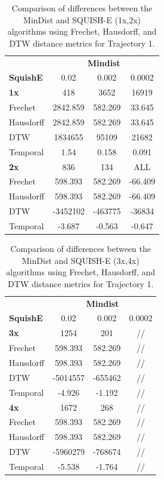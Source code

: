 \begin{table}
	\centering
	\label{tab:mindist_vs_squish_comparison}
	\begin{tabular}{@{}lccc@{}}
		\toprule
		& \multicolumn{3}{c}{\textbf{Mindist}} \\
		\cmidrule(l){2-4}
		\textbf{SquishE} & 0.02 & 0.002 & 0.0002 \\
		\midrule
		\textbf{1x} 	& 418 	& 3652 & 16919 \\
		Frechet 		& 2842.859 & 582.269 & 33.645 \\
		Hausdorff 		& 2842.859 	& 582.269 & 33.645 \\
		DTW 			& 1834655 	& 95109 & 21682 \\
		Temporal 		& 1.54 	& 0.158 & 0.091 \\ \midrule
		\textbf{2x} 	& 836 & 134 & ALL \\
		Frechet 		& 598.393 & 582.269 & -66.409 \\
		Hausdorff 		& 598.393 & 582.269 & -66.409 \\
		DTW  		& -3452102 & -463775 & -36834 \\
		Temporal 	& -3.687 & -0.563 & -0.647 \\ 
		\bottomrule
	\end{tabular}
	\caption{Comparison of differences between the MinDist and SQUISH-E (1x,2x) algorithms using Frechet, Hausdorff, and DTW distance metrics for Trajectory 1.}
\end{table}

\begin{table}
	\centering
	\label{tab:mindist_vs_squish_comparison_2}
	\begin{tabular}{@{}lccc@{}}
		\toprule
		& \multicolumn{3}{c}{\textbf{Mindist}} \\
		\cmidrule(l){2-4}
		\textbf{SquishE} & 0.02 & 0.002 & 0.0002 \\
		\midrule
		\textbf{3x} 	& 1254 & 201 & // \\
		Frechet 		& 598.393 & 582.269 &  // \\
		Hausdorff 		& 598.393 & 582.269 &  // \\
		DTW 		& -5014557 & -655462 &  // \\
		Temporal 			& -4.926 & -1.192 & // \\ \midrule
		\textbf{4x} 	& 1672 & 268 &  // \\
		Frechet 		& 598.393 & 582.269 &  // \\
		Hausdorff 		& 598.393 & 582.269 &  // \\
		DTW 		& -5960279 & -768674 &  // \\
		Temporal 			& -5.538 & -1.764 &  // \\
		\bottomrule
	\end{tabular}
	\caption{Comparison of differences between the MinDist and SQUISH-E (3x,4x) algorithms using Frechet, Hausdorff, and DTW distance metrics for Trajectory 1.}
\end{table}



